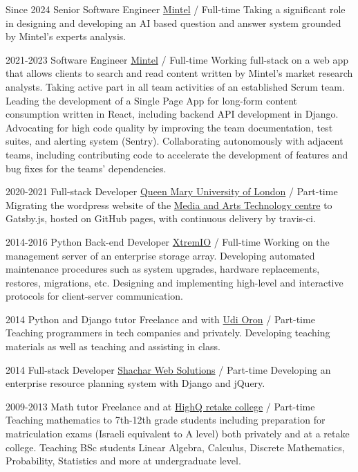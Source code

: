 \documentclass[]{friggeri-cv}
\begin{document}
\begin{entrylist}

  \entry
  {Since 2024}
  {Senior Software Engineer}
  {\href{https://www.mintel.com/}{Mintel} / Full-time}
  {
    Taking a significant role in designing and developing an AI based question and answer system grounded by Mintel's experts analysis.
  }

  \entry
  {2021-2023}
  {Software Engineer}
  {\href{https://www.mintel.com/}{Mintel} / Full-time}
  {
    Working full-stack on a web app that allows clients to search and read content written by Mintel's market research analysts. Taking active part in all team activities of an established Scrum team.
    Leading the development of a Single Page App for long-form content consumption written in React, including backend API development in Django.
    Advocating for high code quality by improving the team documentation, test suites, and alerting system (Sentry).
    Collaborating autonomously with adjacent teams, including contributing code to accelerate the development of features and bug fixes for the teams' dependencies.
  }

  \entry
  {2020-2021}
  {Full-stack Developer}
  {\href{https://qmul.ac.uk/}{Queen Mary University of London} / Part-time}
  {
    Migrating the wordpress website of the \href{https://mat.qmul.ac.uk/}{Media and Arts Technology centre} to Gatsby.js, hosted on GitHub pages, with continuous delivery by travis-ci.
  }

  \entry
  {2014-2016}
  {Python Back-end Developer}
  {\href{http://xtremio.com/}{XtremIO} / Full-time}
  {
    Working on the management server of an enterprise storage array.
    Developing automated maintenance procedures such as system upgrades, hardware replacements, restores, migrations, etc.
    Designing and implementing high-level and interactive protocols for client-server communication.
  }

  \entry
  {2014}
  {Python and Django tutor}
  {Freelance and with \href{http://www.10x.org.il/}{Udi Oron} / Part-time}
  {
    Teaching programmers in tech companies and privately.
    Developing teaching materials as well as teaching and assisting in class.
  }

  \entry
  {2014}
  {Full-stack Developer}
  {\href{http://www.shachar-web.co.il/eng/}{Shachar Web Solutions} / Part-time}
  {
    Developing an enterprise resource planning system with Django and jQuery.
  }

  \entry
  {2009-2013}
  {Math tutor}
  {Freelance and at \href{https://www.high-q.co.il/}{HighQ retake college} / Part-time}
  {
    Teaching mathematics to 7th-12th grade students including preparation for matriculation exams (Israeli equivalent to A level) both privately and at a retake college.
    Teaching BSc students Linear Algebra, Calculus, Discrete Mathematics, Probability, Statistics and more at undergraduate level.
  }

\end{entrylist}
\end{document}
